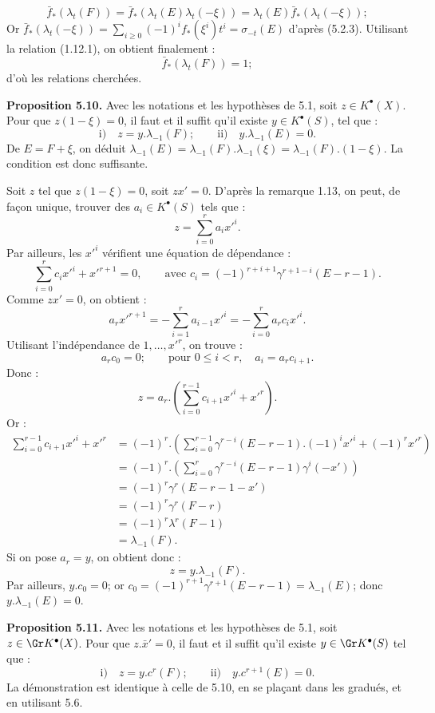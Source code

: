 \[
  \bar f_*(\lambda_t(F))=
  \bar f_*(\lambda_t(E)\lambda_t(-\xi))=
  \lambda_t(E)\bar f_*(\lambda_t(-\xi));
\]
Or $\bar f_*(\lambda_t(-\xi))=\sum_{i\ge0}(-1)^if_*(\xi^i)t^i=\sigma_{-t}(E)$ d'après (5.2.3).
Utilisant la relation (1.12.1), on obtient finalement :
\[
  \bar f_*(\lambda_t(F))=1;
\]
d'où les relations cherchées.

\textbf{Proposition 5.10.} Avec les notations et les hypothèses de 5.1, soit $z\in K^{\bullet}(X)$. Pour que $z(1-\xi)=0$, il faut et il suffit qu'il existe $y\in K^{\bullet}(S)$, tel que :
\[
  \text{i)}\quad z=y.\lambda_{-1}(F);
  \qquad
  \text{ii)}\quad y.\lambda_{-1}(E)=0.
\]
De $E=F+\xi$, on déduit $\lambda_{-1}(E)=\lambda_{-1}(F).\lambda_{-1}(\xi)=\lambda_{-1}(F).(1-\xi)$. La condition est donc suffisante.

Soit $z$ tel que $z(1-\xi)=0$, soit $zx'=0$. D'après la remarque 1.13, on peut, de façon unique, trouver des $a_i\in K^{\bullet}(S)$ tels que :
\[
  z=\sum_{i=0}^{r}a_i{x'}^i .
\]
Par ailleurs, les ${x'}^i$ vérifient une équation de dépendance :
\[
  \sum_{i=0}^{r}c_i{x'}^i+{x'}^{r+1}=0,
  \qquad \text{avec } c_i=(-1)^{r+i+1}\gamma^{r+1-i}(E-r-1).
\]
Comme $zx'=0$, on obtient :
\[
  a_r{x'}^{r+1}=-\sum_{i=1}^{r}a_{i-1}{x'}^i
  =-\sum_{i=0}^{r}a_rc_i{x'}^i .
\]
Utilisant l'indépendance de $1,\ldots,{x'}^r$, on trouve :
\[
  a_rc_0=0;
  \qquad \text{pour } 0\le i<r,
  \quad a_i=a_rc_{i+1}.
\]
Donc :
\[
  z=a_r.\left(\sum_{i=0}^{r-1}c_{i+1}{x'}^i+{x'}^r\right).
\]
Or :
\[
\begin{aligned}
\sum_{i=0}^{r-1}c_{i+1}{x'}^i+{x'}^r
&=(-1)^r.\left(\sum_{i=0}^{r-1}\gamma^{r-i}(E-r-1).(-1)^i{x'}^i+(-1)^r{x'}^r\right)\\
&=(-1)^r.\left(\sum_{i=0}^{r}\gamma^{r-i}(E-r-1)\gamma^i(-x')\right)\\
&=(-1)^r\gamma^r(E-r-1-x')\\
&=(-1)^r\gamma^r(F-r)\\
&=(-1)^r\lambda^r(F-1)\\
&=\lambda_{-1}(F).
\end{aligned}
\]
Si on pose $a_r=y$, on obtient donc :
\[
  z=y.\lambda_{-1}(F).
\]
Par ailleurs, $y.c_0=0$; or $c_0=(-1)^{r+1}\gamma^{r+1}(E-r-1)=\lambda_{-1}(E)$; donc $y.\lambda_{-1}(E)=0$.

\textbf{Proposition 5.11.} Avec les notations et les hypothèses de 5.1, soit $z\in \Gr K^{\bullet}(X)$. Pour que $z.\bar x'=0$, il faut et il suffit qu'il existe $y\in \Gr K^{\bullet}(S)$ tel que :
\[
  \text{i)}\quad z=y.c^r(F);
  \qquad
  \text{ii)}\quad y.c^{r+1}(E)=0.
\]
La démonstration est identique à celle de 5.10, en se plaçant dans les gradués, et en utilisant 5.6.


